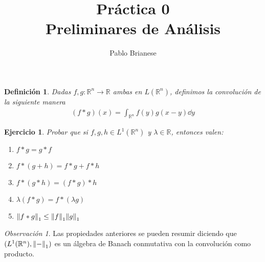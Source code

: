 \documentclass{article}
\title{Práctica 0 \\ Preliminares de Análisis}
\author{Pablo Brianese}
\newcommand{\placeholderParameter}{-}
\newcommand{\realNumbers}{\mathbb{R}}
\newtheorem{definition}{Definición}
\newtheorem{exercise}{Ejercicio}
\theoremstyle{remark}
\newtheorem{remark}{Observación}
\begin{document}
\maketitle
  \begin{definition}
    Dadas \(f, g : \realNumbers^n \rightarrow \realNumbers\) ambas en \(L(\realNumbers^n)\), definimos la convolución de la siguiente manera
    \begin{align}
      (f * g) (x)
      =
      \int_{\realNumbers^n} f(y) g(x - y) \dd y
    \end{align}
  \end{definition}

  \begin{exercise}
    Probar que si \(f, g, h \in L^1(\realNumbers^n)\) y \(\lambda \in \realNumbers\), entonces valen:
    \begin{enumerate}
      \item 
        \label{exercise:convolutionConmutativity}
        \(f * g = g * f\)
      \item \(f * (g + h) = f * g + f * h\)
      \item \(f * (g * h) = (f * g) * h\)
      \item \(\lambda (f * g) = f * (\lambda g)\)
      \item \(\norm{f * g}_1 \leq \norm{f}_1 \norm{g}_1\)
    \end{enumerate}
  \end{exercise}

  \begin{remark}
    Las propiedades anteriores se pueden resumir diciendo que \((L^1(\realNumbers^n), \norm{\placeholderParameter}_1)\) es un álgebra de Banach conmutativa con la convolución como producto.
  \end{remark}
\end{document}
